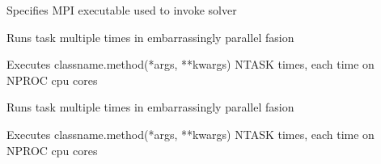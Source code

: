 \documentclass[letterpaper,10pt,english]{sphinxmanual}
\begin{document}
\begin{fulllineitems}

\begin{fulllineitems}
\label{\detokenize{ref/seisflows.system:seisflows.system.lsf_lg.lsf_lg.mpiexec}}
Specifies MPI executable used to invoke solver

\end{fulllineitems}


\begin{fulllineitems}
\label{\detokenize{ref/seisflows.system:seisflows.system.lsf_lg.lsf_lg.run}}
Runs task multiple times in embarrassingly parallel fasion

Executes classname.method(*args, **kwargs) NTASK times, each time on
NPROC cpu cores

\end{fulllineitems}


\begin{fulllineitems}
\label{\detokenize{ref/seisflows.system:seisflows.system.lsf_lg.lsf_lg.run_single}}
Runs task multiple times in embarrassingly parallel fasion

Executes classname.method(*args, **kwargs) NTASK times, each time on
NPROC cpu cores

\end{fulllineitems}


\begin{fulllineitems}
\label{\detokenize{ref/seisflows.system:seisflows.system.lsf_lg.lsf_lg.save_kwargs}}
\end{fulllineitems}


\end{fulllineitems}
\end{document}

